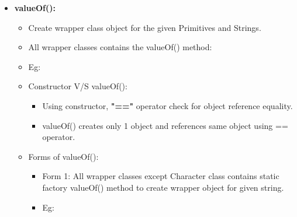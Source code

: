 \setlength{\columnsep}{3pt}
\begin{flushleft}
	
	\begin{itemize}
		\item \textbf{valueOf():}
		\begin{itemize}
			\item Create wrapper class object for the given Primitives and Strings.
			\item All wrapper classes contains the valueOf() method:
			\item Eg:
			\item Constructor V/S valueOf():
			\begin{itemize}
				\item Using constructor, \textbf{"=="} operator check for object reference equality.
				\item valueOf() creates only 1 object and references same object using == operator.
			\end{itemize}
			
			\item Forms of valueOf():
			\begin{itemize}
				\item Form 1: All wrapper classes except Character class contains static factory valueOf() method to create wrapper object for given string.
				\item Eg:
			

\end{itemize}
\end{itemize}
\end{itemize}
\end{flushleft}

